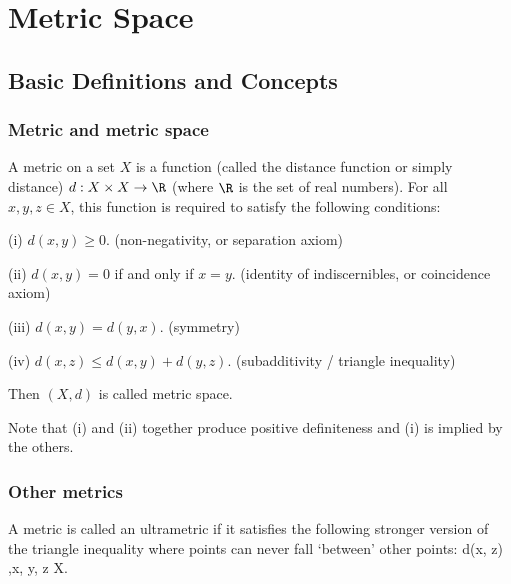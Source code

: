 \chapter{Metric Space}


\section{Basic Definitions and Concepts}

\subsection{Metric and metric space}

\begin{definition}\label{def:metric_space}
A metric on a set $X$ is a function (called the distance function or simply distance) $d : X \times X \to \R$ (where $\R$ is the set of real numbers). For all $x, y, z \in X$, this function is required to satisfy the following conditions:
\ben
\item [(i)] $d(x, y) \geq 0$. (non-negativity, or separation axiom)
\item [(ii)] $d(x, y) = 0$ if and only if $x = y$. (identity of indiscernibles, or coincidence axiom)
\item [(iii)] $d(x, y) = d(y, x)$. (symmetry)
\item [(iv)] $d(x, z) \leq d(x, y) + d(y, z)$. (subadditivity / triangle inequality)
\een

Then $(X,d)$ is called metric space.
\end{definition}

\begin{remark}
Note that (i) and (ii) together produce positive definiteness and (i) is implied by the others.
\end{remark}

\subsection{Other metrics}

\begin{definition}\label{def:ultrametric}
A metric is called an ultrametric if it satisfies the following stronger version of the triangle inequality where points can never fall `between' other points:
\be
d(x, z) \leq \max{},\quad \forall x, y, z \in X.
\ee
\end{definition}

